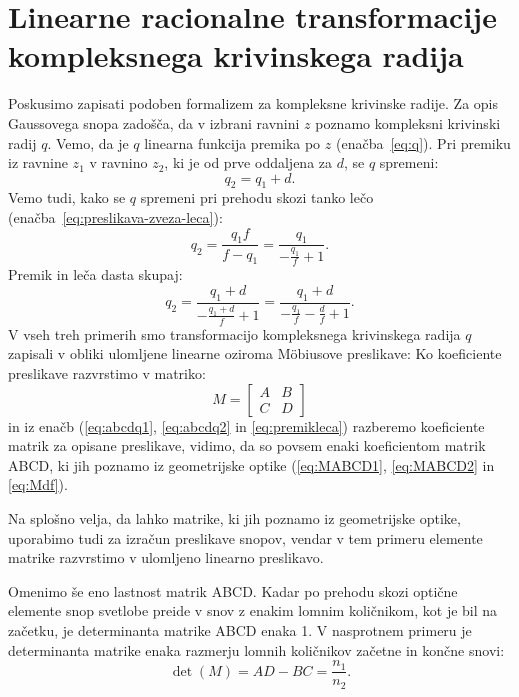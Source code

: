 \section{Linearne racionalne transformacije kompleksnega krivinskega radija}
\label{chap:ABCD}
Poskusimo zapisati podoben formalizem za kompleksne krivinske
radije. Za opis Gaussovega snopa zadošča, da v izbrani ravnini $z$ poznamo kompleksni
krivinski radij $q$. Vemo, da je $q$ linearna funkcija
premika po $z$ (enačba~\ref{eq:q}). Pri premiku iz ravnine $z_1$ v ravnino $z_2$, ki je od prve oddaljena
za $d$, se $q$ spremeni:
\begin{equation}
q_2=q_1+d.
\label{eq:abcdq1}
\end{equation}
Vemo tudi, kako se $q$ 
spremeni pri prehodu skozi tanko lečo (enačba~\ref{eq:preslikava-zveza-leca}):
\begin{equation}
q_2=\frac{q_1f}{f-q_1}=\frac{q_1}{-\frac{q_1}{f}+1}.
\label{eq:abcdq2}
\end{equation}
Premik in leča dasta skupaj:
\begin{equation}
q_2=\frac{q_1+d}{-\frac{q_1+d}{f}+1}=\frac{q_1+d}{-\frac{q_1}{f}-\frac{d}{f}+1}.
\label{eq:premikleca}
\end{equation}
V vseh treh primerih smo transformacijo kompleksnega krivinskega radija 
$q$ zapisali v obliki ulomljene linearne oziroma M\"obiusove 
preslikave:
Ko koeficiente preslikave razvrstimo v matriko:
\begin{equation}
M= \left[\begin{array}{cc}
A & B\\
C & D
\end{array}\right]
\end{equation}
in iz enačb (\ref{eq:abcdq1}, \ref{eq:abcdq2} in \ref{eq:premikleca}) razberemo 
koeficiente matrik  za opisane 
preslikave, vidimo, da so povsem enaki koeficientom matrik ABCD, ki jih poznamo iz
geometrijske optike (\ref{eq:MABCD1}, \ref{eq:MABCD2} in \ref{eq:Mdf}). 

Na splošno
velja, da lahko matrike, ki jih
poznamo iz geometrijske optike, uporabimo tudi za izračun preslikave snopov,
vendar v tem primeru elemente matrike razvrstimo v ulomljeno linearno preslikavo.

Omenimo še eno lastnost matrik ABCD. Kadar po prehodu skozi optične elemente snop svetlobe 
preide v snov z enakim lomnim količnikom, kot je bil na začetku, je determinanta matrike 
ABCD enaka 1. V nasprotnem
primeru je determinanta matrike enaka razmerju lomnih količnikov začetne in končne snovi:
\begin{equation}
\det(M) = AD-BC = \frac{n_1}{n_2}.
\label{eq:detabcd}
\end{equation}

